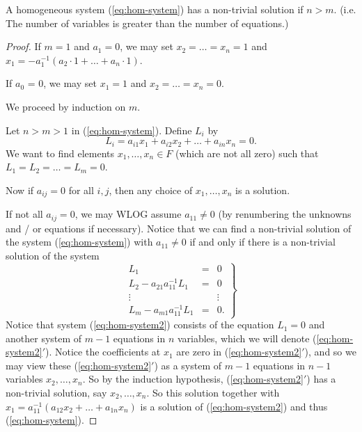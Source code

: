 \begin{theorem} \label{thm:1}
	A homogeneous system (\ref{eq:hom-system}) has a non-trivial solution if $n > m$. (i.e. The number of variables is greater than the number of equations.)
	\begin{proof}
		If $m = 1$ and $a_1 = 0$, we may set $x_2 = \ldots = x_n = 1$ and $x_1 = -a_1^{-1}(a_2 \cdot 1 + \ldots + a_n \cdot 1)$.
		
		If $a_0$ = 0, we may set $x_1 = 1$ and $x_2 = \ldots = x_n = 0$.
		
		We proceed by induction on $m$.
		
		Let $n > m > 1$ in (\ref{eq:hom-system}). Define $L_i$ by
		\[
			L_i = a_{i 1} x_1 + a_{i 2} x_2 + \ldots + a_{i n} x_n = 0.
		\]
		We want to find elements $x_1, \ldots, x_n \in F$ (which are not all zero) such that $L_1 = L_2 = \ldots = L_m = 0$.
		
		Now if $a_{i j} = 0$ for all $i, j$, then any choice of $x_1, \ldots, x_n$ is a solution.
		
		If not all $a_{i j} = 0$, we may WLOG assume $a_{1 1} \neq 0$ (by renumbering the unknowns and / or equations if necessary). Notice that we can find a non-trivial solution of the system (\ref{eq:hom-system}) with $a_{1 1} \neq 0$ if and only if there is a non-trivial solution of the system
		\begin{equation} \label{eq:hom-system2}
			\left.
			\begin{matrix}
				L_1							 &=& 0 \\
				L_2 - a_{21} a_{11}^{-1} L_1 &=& 0 \\
				\vdots						 & & \vdots \\
				L_m - a_{m1} a_{11}^{-1} L_1 &=& 0.
			\end{matrix}
			\right\}
		\end{equation}
		Notice that system (\ref{eq:hom-system2}) consists of the equation $L_1 = 0$ and another system of $m - 1$ equations in $n$ variables, which we will denote (\ref{eq:hom-system2}$'$). Notice the coefficients at $x_1$ are zero in (\ref{eq:hom-system2}$'$), and so we may view these (\ref{eq:hom-system2}$'$) as a system of $m - 1$ equations in $n - 1$ variables $x_2, \ldots, x_n$. So by the induction hypothesis, (\ref{eq:hom-system2}$'$) has a non-trivial solution, say $x_2, \ldots, x_n$. So this solution together with $x_1 = a_{11}^{-1}(a_{12}x_2 + \ldots + a_{1n}x_n)$ is a solution of (\ref{eq:hom-system2}) and thus (\ref{eq:hom-system}).
	\end{proof}
\end{theorem}

